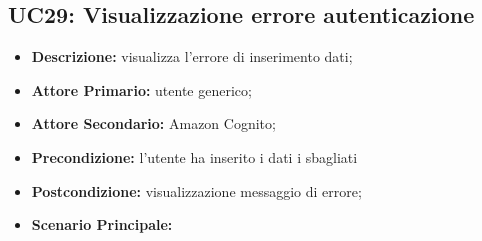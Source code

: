 \subsection{UC29: Visualizzazione errore autenticazione }
\label{sec:UC29}
\begin{itemize}
    \item \textbf{Descrizione:} visualizza l'errore di inserimento dati;
    \item \textbf{Attore Primario:} utente generico;
    \item \textbf{Attore Secondario:} Amazon Cognito;
    \item \textbf{Precondizione:} l'utente ha inserito i dati i sbagliati
    \item \textbf{Postcondizione:} visualizzazione messaggio di errore;
    \item \textbf{Scenario Principale:} 
\end{itemize}